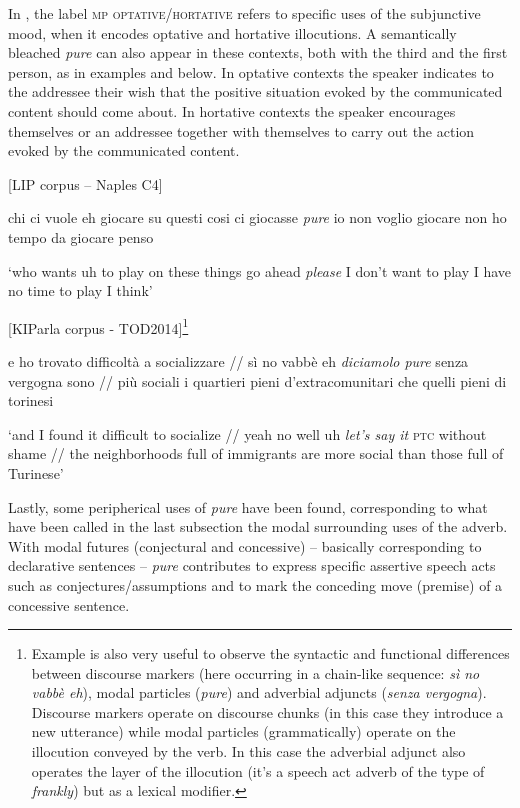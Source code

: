 In , the label \textsc{mp} \textsc{optative/hortative} refers to specific uses of the subjunctive mood, when it encodes optative and hortative illocutions. A semantically bleached \textit{pure} can also appear in these contexts, both with the third and the first person, as in examples  and  below. In optative contexts the speaker indicates to the addressee their wish that the positive situation evoked by the communicated content should come about. In hortative contexts the speaker encourages themselves or an addressee together with themselves to carry out the action evoked by the communicated content.

\ea%
    \label{ex:key:34}

         [LIP corpus – Naples C4]

chi ci vuole eh giocare su questi cosi ci giocasse \textit{pure} io non voglio giocare non ho tempo da giocare penso

\glt ‘who wants uh to play on these things go ahead \textit{please} I don’t want to play I have no time to play I think’
    \z

\ea%
    \label{ex:key:35}

          [KIParla corpus - TOD2014]\footnote{Example  is also very useful to observe the syntactic and functional differences between discourse markers (here occurring in a chain-like sequence: \textit{sì no vabbè eh}), modal particles (\textit{pure}) and adverbial adjuncts (\textit{senza vergogna}). Discourse markers operate on discourse chunks (in this case they introduce a new utterance) while modal particles (grammatically) operate on the illocution conveyed by the verb. In this case the adverbial adjunct also operates the layer of the illocution (it’s a speech act adverb of the type of \textit{frankly}) but as a lexical modifier.}

e ho trovato difficoltà a socializzare // sì no vabbè eh \textit{diciamolo pure} senza vergogna sono // più sociali i quartieri pieni d’extracomunitari che quelli pieni di torinesi

\glt ‘and I found it difficult to socialize // yeah no well uh \textit{let’s say it} \textsc{ptc} without shame // the neighborhoods full of immigrants are more social than those full of Turinese’
    \z

Lastly, some peripherical uses of \textit{pure} have been found, corresponding to what have been called in the last subsection the modal surrounding uses of the adverb. With modal futures (conjectural and concessive) – basically corresponding to declarative sentences – \textit{pure} contributes to express specific assertive speech acts such as conjectures/assumptions and to mark the conceding move (premise) of a concessive sentence.

